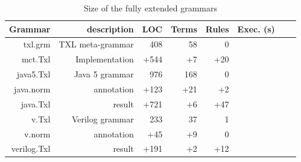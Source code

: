 \documentclass[10pt, conference, compsocconf]{IEEEtran}
\begin{document}
{\begin{table}\centering
\caption{Size of the fully extended grammars\label{table:2}}
\begin{tabular}{| r || r | r | r | r |  r |  r |  r  |}\hline
{\bf Grammar} & description & LOC & Terms &  Rules & Exec. (s) \\  \hline\hline
txl.grm & TXL meta-grammar & 408 & 58 & 0  &\\
mct.Txl & Implementation & +544 & +7 & +20 &\\ \hline
java5.Txl & Java 5 grammar &  976 & 168 & 0 &\\
java.norm & annotation & +123 & +21 & +2 &\\ 
java.Txl & result & +721  & +6 & +47  & \\\hline  
v.Txl & Verilog grammar & 233 &  37 &  1 &\\
v.norm & annotation & +45 & +9 & 0 &\\
verilog.Txl & result & +191 &  +2 & +12 &\\\hline
\hline\end{tabular}
\end{table}

}
\end{document}
